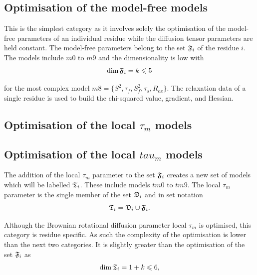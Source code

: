 
\subsection{Optimisation of the model-free models}

This is the simplest category as it involves solely the optimisation of the model-free parameters of an individual residue while the diffusion tensor parameters are held constant.
The model-free parameters belong to the set $\mathfrak{F}_i$ of the residue $i$.
The models include $m0$ to $m9$ and the dimensionality is low with
\begin{equation}
    \dim \mathfrak{F}_i = k \leqslant 5
\end{equation}

\noindent for the most complex model $m8 = \{S^2, \tau_f, S^2_f, \tau_s, R_{ex}\}$.
The relaxation data of a single residue is used to build the chi-squared value, gradient, and Hessian.



\begin{latexonly}
    \subsection{Optimisation of the local $\tau_m$ models}
\end{latexonly}
\begin{htmlonly}
    \subsection{Optimisation of the local $tau_m$ models}
\end{htmlonly}

The addition of the local $\tau_m$ parameter to the set $\mathfrak{F}_i$ creates a new set of models which will be labelled $\mathfrak{T}_i$.
These include models $tm0$ to $tm9$.
The local $\tau_m$ parameter is the single member of the set $\mathfrak{D}_i$ and in set notation
\begin{equation}
    \mathfrak{T}_i = \mathfrak{D}_i \cup \mathfrak{F}_i.
\end{equation}

Although the Brownian rotational diffusion parameter local $\tau_m$ is optimised, this category is residue specific.
As such the complexity of the optimisation is lower than the next two categories.
It is slightly greater than the optimisation of the set $\mathfrak{F}_i$ as
\begin{equation}
    \dim \mathfrak{T}_i = 1 + k \leqslant 6,
\end{equation}

